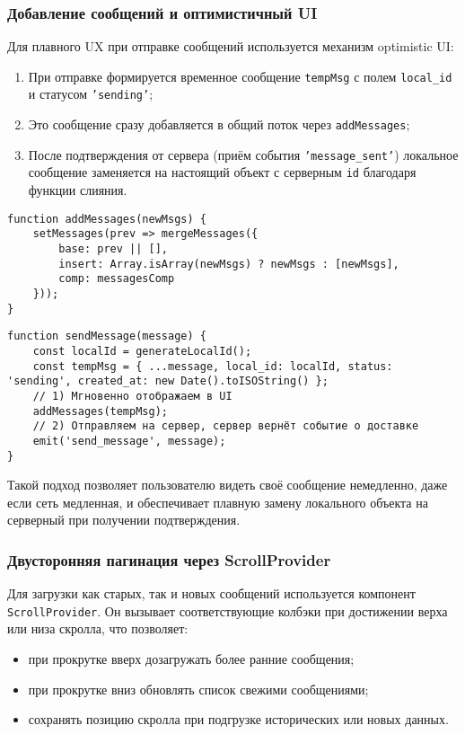 \subsubsection{Добавление сообщений и оптимистичный UI}
Для плавного UX при отправке сообщений используется механизм optimistic UI:
\begin{enumerate}
  \item При отправке формируется временное сообщение \texttt{tempMsg} с полем \texttt{local\_id} и статусом \texttt{'sending'};
  \item Это сообщение сразу добавляется в общий поток через \texttt{addMessages};
  \item После подтверждения от сервера (приём события \texttt{'message\_sent'}) локальное сообщение заменяется на настоящий объект с серверным \texttt{id} благодаря функции слияния.
\end{enumerate}

\begin{lstlisting}[caption={Функция addMessages}, label={lst:addMessages}]
function addMessages(newMsgs) {
    setMessages(prev => mergeMessages({
        base: prev || [],
        insert: Array.isArray(newMsgs) ? newMsgs : [newMsgs],
        comp: messagesComp
    }));
}
\end{lstlisting}

\begin{lstlisting}[caption={Отправка сообщения sendMessage}, label={lst:sendMessage}]
function sendMessage(message) {
    const localId = generateLocalId();
    const tempMsg = { ...message, local_id: localId, status: 'sending', created_at: new Date().toISOString() };
    // 1) Мгновенно отображаем в UI
    addMessages(tempMsg);
    // 2) Отправляем на сервер, сервер вернёт событие о доставке
    emit('send_message', message);
}
\end{lstlisting}

Такой подход позволяет пользователю видеть своё сообщение немедленно, даже если сеть медленная, и обеспечивает плавную замену локального объекта на серверный при получении подтверждения.

\subsubsection{Двусторонняя пагинация через ScrollProvider}
Для загрузки как старых, так и новых сообщений используется компонент \texttt{ScrollProvider}. Он вызывает соответствующие колбэки при достижении верха или низа скролла, что позволяет:
\begin{itemize}
  \item при прокрутке вверх дозагружать более ранние сообщения;
  \item при прокрутке вниз обновлять список свежими сообщениями;
  \item сохранять позицию скролла при подгрузке исторических или новых данных.
\end{itemize}

